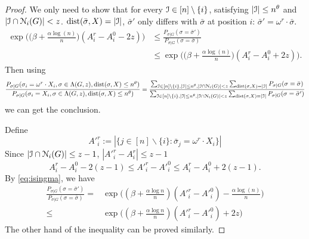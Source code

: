 \documentclass{article}
\begin{document}
\begin{proof}
	We only need to show that for every $\mathcal{I}\in [n]\setminus\{i\}$, satisfying $|\mathcal{I}|\le n^\theta$ and
	$|\mathcal{I} \cap \mathcal{N}_i(G)| < z$. $\operatorname{dist}(\bar{\sigma}, X) = |\mathcal{I}|$, $\bar{\sigma}'$ only differs with $\bar{\sigma}$ at
	position $i$: $\bar{\sigma}' = \omega^r \cdot \bar{\sigma}$.
	\begin{equation} \label{eq:qk}
	\begin{aligned}
	\exp\Big(\big(\beta+\frac{\alpha\log(n)}{n} \big) (A^r_i-A^0_i - 2z) \Big) & \le 
	\frac{P_{\sigma|G}(\sigma= \bar{\sigma}') } { P_{\sigma|G}(\sigma= \bar{\sigma} ) } \\
	& \le \exp\Big(\big(\beta+\frac{\alpha\log(n)}{n} \big) (A^r_i-A^0_i + 2z) \Big) .
	\end{aligned}
	\end{equation}
	Then using 
	$$
	\frac{P_{\sigma|G}(\sigma_i= \omega^r \cdot X_i, \sigma\in \Lambda(G,z) ,\operatorname{dist}(\sigma, X) \le n^{\theta} ) } 
	{ P_{\sigma|G}(\sigma_i=X_i, \sigma\in \Lambda(G,z) ,\operatorname{dist}(\sigma, X) \le n^{\theta} ) } 
	= \frac{\sum_{\mathcal{I}\in [n]\setminus\{i\},|\mathcal{I}|\le n^\theta,|\mathcal{I} \cap \mathcal{N}_i(G)| < z}\sum_{\operatorname{dist}(\sigma, X)=|\mathcal{I}|} P_{\sigma|G}(\sigma= \bar{\sigma} ) }
	{\sum_{\mathcal{I}\in [n]\setminus\{i\},|\mathcal{I}|\le n^\theta,|\mathcal{I} \cap \mathcal{N}_i(G)| < z}\sum_{\operatorname{dist}(\sigma, X)=|\mathcal{I}|} P_{\sigma|G}(\sigma = \bar{\sigma}' ) } 
	$$
	we can get the conclusion.
	
	Define
	$$
	A'^r_i := |\{ j \in [n]\backslash \{i\}:  \bar{\sigma}_j = \omega^r \cdot X_i \}|
	$$
	Since $|\mathcal{I}\cap \mathcal{N}_{i}(G)| \le z-1$, $|A'^r_i - A^r_i| \leq z-1$
	\begin{equation} \label{eq:oo}
	A^r_i-A^0_i-2(z-1) \le A'^r_i-A'^0_i\le A^r_i-A^0_i+2(z-1) .
	\end{equation}
	By \eqref{eq:isingma}, we have
	\begin{align*}
	 \frac{P_{\sigma|G}(\sigma=  \bar{\sigma}' ) } { P_{\sigma|G}(\sigma= \bar{\sigma}) }
	= & \exp\Big((\beta+\frac{\alpha\log n }{n})(A'^r_i-A'^0_i)
	-\frac{\alpha\log(n)}{n}
	\Big)
	\\
	\leq & \exp\Big((\beta+\frac{\alpha\log n }{n})(A'^r_i-A'^0_i)+2z \Big)
	\end{align*}
	The other hand of the inequality can be proved similarly.
\end{proof}
\end{document}
